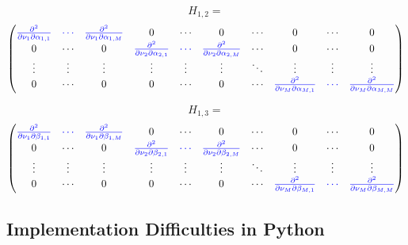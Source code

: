 \documentclass[11pt]{book}
\begin{document}
$$H_{1,2} =  $$
\begin{equation}
\begin{pmatrix}
\textcolor{blue}{\frac{\partial^2 } {\partial \nu_1 \partial \alpha_{1,1} }}
&
 \textcolor{blue}{\cdots }
& 
 \textcolor{blue}{\frac{\partial^2 }{\partial \nu_1 \partial \alpha_{1,M} } } 
&
0 & \cdots & 0  & \cdots & 0 & \cdots & 0
\\%
0       &  \cdots   & 0 &  
\textcolor{blue}{\frac{\partial^2 }{\partial \nu_2 \partial \alpha_{2,1} }}  & 
\textcolor{blue}{\cdots} &  
\textcolor{blue}{\frac{\partial^2 }{\partial \nu_2 \partial \alpha_{2,M} }} & \cdots & 0 & \cdots & 0
\\%
\vdots & \vdots & \vdots & \vdots & \vdots & \vdots  & \ddots & \vdots & \vdots & \vdots
\\%
0  & \cdots & 0 & 0 & \cdots & 0 & \cdots & 
\textcolor{blue}{\frac{\partial^2 } {\partial \nu_M \partial \alpha_{M,1} }} &
\textcolor{blue}{\cdots} & 
\textcolor{blue}{\frac{\partial^2 } {\partial \nu_M \partial \alpha_{M,M} } }
\end{pmatrix}     
\end{equation}

$$H_{1,3} = $$
\begin{equation} 
\begin{pmatrix}
\textcolor{blue}{\frac{\partial^2 } {\partial \nu_1 \partial \beta_{1,1} }}
&
 \textcolor{blue}{\cdots }
& 
 \textcolor{blue}{\frac{\partial^2 }{\partial \nu_1 \partial \beta_{1,M} } } 
&
0 & \cdots & 0  & \cdots & 0 & \cdots & 0
\\%
0       &  \cdots   & 0 &  
\textcolor{blue}{\frac{\partial^2 }{\partial \nu_2 \partial \beta_{2,1} }}  & 
\textcolor{blue}{\cdots} &  
\textcolor{blue}{\frac{\partial^2 }{\partial \nu_2 \partial \beta_{2,M} }} & \cdots & 0 & \cdots & 0
\\%
\vdots & \vdots & \vdots & \vdots & \vdots & \vdots  & \ddots & \vdots & \vdots & \vdots
\\%
0  & \cdots & 0 & 0 & \cdots & 0 & \cdots & 
\textcolor{blue}{\frac{\partial^2 } {\partial \nu_M \partial \beta_{M,1} }} &
\textcolor{blue}{\cdots} & 
\textcolor{blue}{\frac{\partial^2 } {\partial \nu_M \partial \beta_{M,M} } }
\end{pmatrix}     
\end{equation}


\subsection{Implementation Difficulties in Python}
\end{document}
